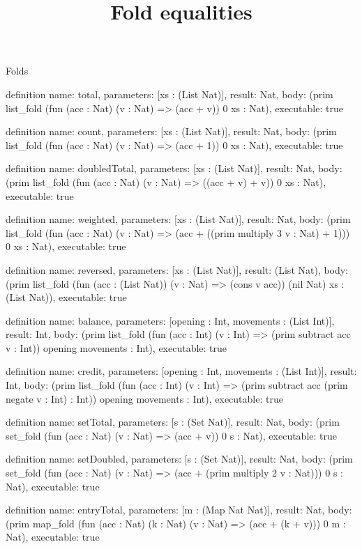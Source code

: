 \begin{lexlean}{Folds}
\title{Fold equalities}
\begin{semanticmodule}
definition{
  name: total,
  parameters: [xs : (List Nat)],
  result: Nat,
  body: (prim list_fold (fun (acc : Nat) (v : Nat) => (acc + v)) 0 xs : Nat),
  executable: true
}

definition{
  name: count,
  parameters: [xs : (List Nat)],
  result: Nat,
  body: (prim list_fold (fun (acc : Nat) (v : Nat) => (acc + 1)) 0 xs : Nat),
  executable: true
}

definition{
  name: doubledTotal,
  parameters: [xs : (List Nat)],
  result: Nat,
  body: (prim list_fold (fun (acc : Nat) (v : Nat) => ((acc + v) + v)) 0 xs : Nat),
  executable: true
}

definition{
  name: weighted,
  parameters: [xs : (List Nat)],
  result: Nat,
  body: (prim list_fold (fun (acc : Nat) (v : Nat) => (acc + ((prim multiply 3 v : Nat) + 1))) 0 xs : Nat),
  executable: true
}

definition{
  name: reversed,
  parameters: [xs : (List Nat)],
  result: (List Nat),
  body: (prim list_fold (fun (acc : (List Nat)) (v : Nat) => (cons v acc)) (nil Nat) xs : (List Nat)),
  executable: true
}

definition{
  name: balance,
  parameters: [opening : Int, movements : (List Int)],
  result: Int,
  body: (prim list_fold (fun (acc : Int) (v : Int) => (prim subtract acc v : Int)) opening movements : Int),
  executable: true
}

definition{
  name: credit,
  parameters: [opening : Int, movements : (List Int)],
  result: Int,
  body: (prim list_fold (fun (acc : Int) (v : Int) => (prim subtract acc (prim negate v : Int) : Int)) opening movements : Int),
  executable: true
}

definition{
  name: setTotal,
  parameters: [s : (Set Nat)],
  result: Nat,
  body: (prim set_fold (fun (acc : Nat) (v : Nat) => (acc + v)) 0 s : Nat),
  executable: true
}

definition{
  name: setDoubled,
  parameters: [s : (Set Nat)],
  result: Nat,
  body: (prim set_fold (fun (acc : Nat) (v : Nat) => (acc + (prim multiply 2 v : Nat))) 0 s : Nat),
  executable: true
}

definition{
  name: entryTotal,
  parameters: [m : (Map Nat Nat)],
  result: Nat,
  body: (prim map_fold (fun (acc : Nat) (k : Nat) (v : Nat) => (acc + (k + v))) 0 m : Nat),
  executable: true
}


\end{semanticmodule}
\end{lexlean}
